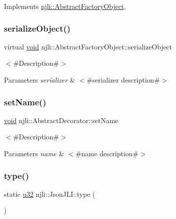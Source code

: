 Implements \mbox{\hyperlink{classnjli_1_1_abstract_factory_object_aad2fbe86fb3bdecf02918a96b9c57976}{njli\+::\+Abstract\+Factory\+Object}}.

\mbox{\label{classnjli_1_1_json_j_l_i_a4fc4bcd9d1930911474210c047372fc0}} 
\subsubsection{\texorpdfstring{serialize\+Object()}{serializeObject()}}
{\footnotesize\ttfamily virtual \mbox{\hyperlink{_thread_8h_af1e856da2e658414cb2456cb6f7ebc66}{void}} njli\+::\+Abstract\+Factory\+Object\+::serialize\+Object}

$<$\#\+Description\#$>$


\begin{DoxyParams}{Parameters}
{\em serializer} & $<$\#serializer description\#$>$ \\
\hline
\end{DoxyParams}
\mbox{\label{classnjli_1_1_json_j_l_i_a087eb5f8d9f51cc476f12f1d10a3cb95}} 
\subsubsection{\texorpdfstring{set\+Name()}{setName()}}
{\footnotesize\ttfamily \mbox{\hyperlink{_thread_8h_af1e856da2e658414cb2456cb6f7ebc66}{void}} njli\+::\+Abstract\+Decorator\+::set\+Name}

$<$\#\+Description\#$>$


\begin{DoxyParams}{Parameters}
{\em name} & $<$\#name description\#$>$ \\
\hline
\end{DoxyParams}
\mbox{\label{classnjli_1_1_json_j_l_i_a5c600e1e7f959c4e277196f73880f224}} 
\subsubsection{\texorpdfstring{type()}{type()}}
{\footnotesize\ttfamily static \mbox{\hyperlink{_util_8h_a10e94b422ef0c20dcdec20d31a1f5049}{u32}} njli\+::\+Json\+J\+L\+I\+::type (\begin{DoxyParamCaption}{ }\end{DoxyParamCaption})\hspace{0.3cm}{\ttfamily [static]}}

